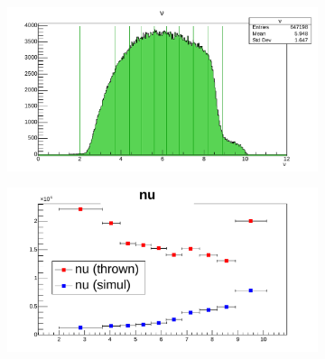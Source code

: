 \begin{figure}[hbtp]
        \begin{subfigure}{.5\textwidth}
            \centering
            \includegraphics[width=\linewidth]{13dataanalysis/img/40_accbins_nu.pdf}
            \label{fig::acc_corr_bins_nu}
        \end{subfigure}
        \begin{subfigure}{.5\textwidth}
            \centering
            \includegraphics[width=\linewidth]{13dataanalysis/img/40_acccorr_nu.pdf}
            \label{fig::acc_corr_nu}
        \end{subfigure}


\end{figure}
